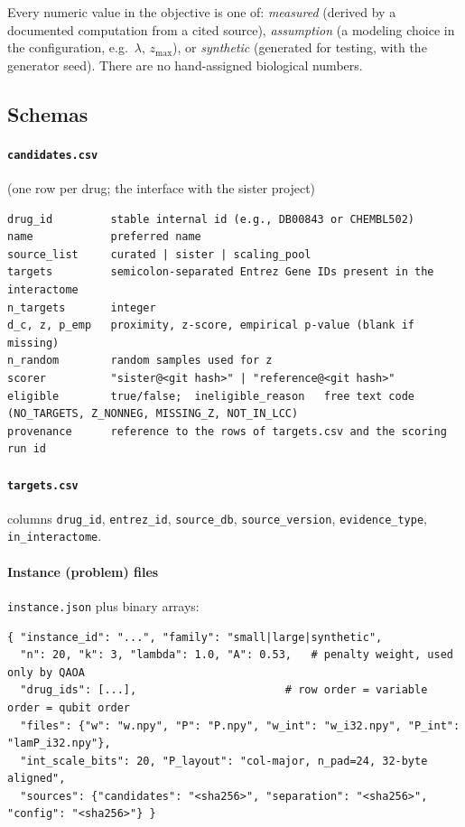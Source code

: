 Every numeric value in the objective is one of: \emph{measured} (derived by a documented computation from a cited source), \emph{assumption} (a modeling choice in the configuration, e.g.\ $\lambda$, $z_{\max}$), or \emph{synthetic} (generated for testing, with the generator seed). There are no hand-assigned biological numbers.

\subsection{Schemas}

\paragraph{\texttt{candidates.csv}} (one row per drug; the interface with the sister project)
\begin{lstlisting}
drug_id         stable internal id (e.g., DB00843 or CHEMBL502)
name            preferred name
source_list     curated | sister | scaling_pool
targets         semicolon-separated Entrez Gene IDs present in the interactome
n_targets       integer
d_c, z, p_emp   proximity, z-score, empirical p-value (blank if missing)
n_random        random samples used for z
scorer          "sister@<git hash>" | "reference@<git hash>"
eligible        true/false;  ineligible_reason   free text code (NO_TARGETS, Z_NONNEG, MISSING_Z, NOT_IN_LCC)
provenance      reference to the rows of targets.csv and the scoring run id
\end{lstlisting}

\paragraph{\texttt{targets.csv}} columns \texttt{drug\_id}, \texttt{entrez\_id}, \texttt{source\_db}, \texttt{source\_version}, \texttt{evidence\_type}, \texttt{in\_interactome}.

\paragraph{Instance (problem) files} \texttt{instance.json} plus binary arrays:
\begin{lstlisting}
{ "instance_id": "...", "family": "small|large|synthetic",
  "n": 20, "k": 3, "lambda": 1.0, "A": 0.53,   # penalty weight, used only by QAOA
  "drug_ids": [...],                       # row order = variable order = qubit order
  "files": {"w": "w.npy", "P": "P.npy", "w_int": "w_i32.npy", "P_int": "lamP_i32.npy"},
  "int_scale_bits": 20, "P_layout": "col-major, n_pad=24, 32-byte aligned",
  "sources": {"candidates": "<sha256>", "separation": "<sha256>", "config": "<sha256>"} }
\end{lstlisting}

